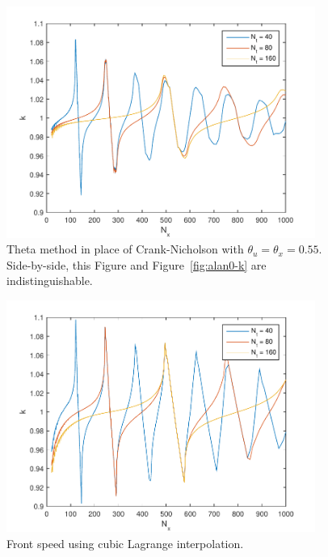 \documentclass{article}
\begin{document}
\begin{figure}[hbtp]
\centering
  \includegraphics[width=0.9\textwidth]{alan3-k.pdf}
  \caption{Theta method in place of Crank-Nicholson with $\theta_u = \theta_x = 0.55$.
    Side-by-side, this Figure and Figure~\ref{fig:alan0-k} are indistinguishable.
  \label{fig:alan3-k}}
\end{figure}
\begin{figure}[htbp]
\centering
  \includegraphics[width=0.9\textwidth]{alan6-k.pdf}
  \caption{Front speed using cubic Lagrange interpolation.
  \label{fig:alan6-k}}
\end{figure}
\end{document}
